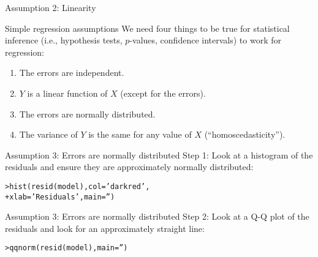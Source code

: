 \documentclass{beamer}\usepackage[]{graphicx}\usepackage[]{color}
\makeatletter
\newcommand{\hlstr}[1]{\textcolor[rgb]{1,0.894,0.71}{#1}}%
\newcommand{\hlstd}[1]{\textcolor[rgb]{1,0.894,0.769}{#1}}%
\newcommand{\hlkwc}[1]{\textcolor[rgb]{0.78,0.941,0.545}{#1}}%
\newcommand{\hlkwd}[1]{\textcolor[rgb]{1,0.78,0.769}{#1}}%
\newenvironment{kframe}{%
 \def\at@end@of@kframe{}%
 \ifinner\ifhmode%
  \def\at@end@of@kframe{\end{minipage}}%
  \begin{minipage}{\columnwidth}%
 \fi\fi%
 \def\FrameCommand##1{\hskip\@totalleftmargin \hskip-\fboxsep
 \colorbox{shadecolor}{##1}\hskip-\fboxsep
     \hskip-\linewidth \hskip-\@totalleftmargin \hskip\columnwidth}%
 \MakeFramed {\advance\hsize-\width
   \@totalleftmargin\z@ \linewidth\hsize
   \@setminipage}}%
 {\par\unskip\endMakeFramed%
 \at@end@of@kframe}
\newenvironment{knitrout}{}{} %
\makeatother
\begin{document}
\begin{darkframes}
\begin{frame}[fragile]{Assumption 2: Linearity}
\begin{knitrout}
\end{knitrout}
    \end{frame}

    \begin{frame}{Simple regression assumptions}
      We need four things to be true for statistical inference (i.e., hypothesis tests, $p$-values, confidence intervals) to work for regression:
      \begin{enumerate}
        \item The errors are independent. \greencheckmark
        \item $Y$ is a linear function of $X$ (except for the errors). \greencheckmark
        \item The errors are normally distributed.
        \item The variance of $Y$ is the same for any value of $X$ (``homoscedasticity'').
      \end{enumerate}
    \end{frame}

    \begin{frame}[fragile]{Assumption 3: Errors are normally distributed}
      Step 1: Look at a histogram of the residuals and ensure they are approximately normally distributed:
\begin{knitrout}
\begin{kframe}
\begin{alltt}
\hlstd{> }\hlkwd{hist}\hlstd{(}\hlkwd{resid}\hlstd{(model),} \hlkwc{col}\hlstd{=}\hlstr{'darkred'}\hlstd{,}
\hlstd{+ }  \hlkwc{xlab}\hlstd{=}\hlstr{'Residuals'}\hlstd{,} \hlkwc{main}\hlstd{=}\hlstr{''}\hlstd{)}
\end{alltt}
\end{kframe}


\end{knitrout}
    \end{frame}

    \begin{frame}[fragile]{Assumption 3: Errors are normally distributed}
      Step 2: Look at a Q-Q plot of the residuals and look for an approximately straight line:
\begin{knitrout}
\begin{kframe}
\begin{alltt}
\hlstd{> }\hlkwd{qqnorm}\hlstd{(}\hlkwd{resid}\hlstd{(model),} \hlkwc{main}\hlstd{=}\hlstr{''}\hlstd{)}
\end{alltt}
\end{kframe}



\end{knitrout}
\end{frame}
\end{darkframes}
\end{document}
